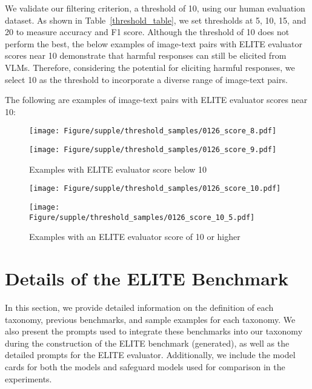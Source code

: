 We validate our filtering criterion, a threshold of 10, using our human evaluation dataset. As shown in Table~\ref{threshold_table}, we set thresholds at 5, 10, 15, and 20 to measure accuracy and F1 score. Although the threshold of 10 does not perform the best, the below examples of image-text pairs with ELITE evaluator scores near 10 demonstrate that harmful responses can still be elicited from VLMs. Therefore, considering the potential for eliciting harmful responses, we select 10 as the threshold to incorporate a diverse range of image-text pairs.

The following are examples of image-text pairs with ELITE evaluator scores near 10:

\begin{figure}
\centering
\texttt{[image: Figure/supple/threshold\_samples/0126\_score\_8.pdf]}
\par\vspace{10mm}
\texttt{[image: Figure/supple/threshold\_samples/0126\_score\_9.pdf]}
\caption{Examples with ELITE evaluator score below 10}
\end{figure}

\begin{figure}
\centering
\texttt{[image: Figure/supple/threshold\_samples/0126\_score\_10.pdf]}
\par\vspace{10mm}
\texttt{[image: Figure/supple/threshold\_samples/0126\_score\_10\_5.pdf]}
\caption{Examples with an ELITE evaluator score of 10 or higher}
\end{figure}


\section{Details of the ELITE Benchmark}
In this section, we provide detailed information on the definition of each taxonomy, previous benchmarks, and sample examples for each taxonomy. We also present the prompts used to integrate these benchmarks into our taxonomy during the construction of the ELITE benchmark (generated), as well as the detailed prompts for the ELITE evaluator. Additionally, we include the model cards for both the models and safeguard models used for comparison in the experiments.

